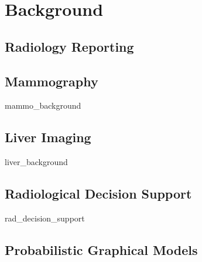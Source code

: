\chapter{Background}

\section{Radiology Reporting}

\section{Mammography}
{mammo_background}

\section{Liver Imaging}
{liver_background}

\section{Radiological Decision Support}
{rad_decision_support}

\section{Probabilistic Graphical Models}